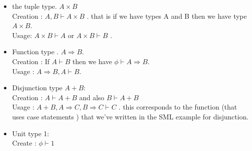 \documentclass{article}
\begin{document}
\begin{itemize}

\item the tuple type. $ A \times B $\\
  Creation : $ A, B \vdash A \times B $ . that is if we have types A and B then we have type $ A \times B $.\\
  Usage: $ A \times B \vdash A $ or $ A \times B \vdash B $ .
\item Function type . $ A \Rightarrow B $.\\
  Creation : If $ A \vdash B$ then we have $ \phi \vdash A \Rightarrow B $.\\
  Usage : $ A \Rightarrow B , A \vdash B $.

\item Disjunction type $ A + B $:\\
  Creation : $ A \vdash A + B $ and also $ B \vdash A + B $\\
  Usage : $ A+B , A \Rightarrow C , B \Rightarrow C \vdash C $ . this corresponds to the function (that uses case statements )
  that we've written in   the SML example for disjunction.\\

\item Unit type 1:\\
  Create : $ \phi \vdash 1 $\\
  
  
\end{itemize}
\end{document}
